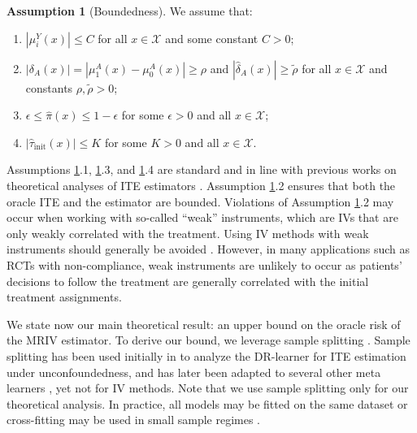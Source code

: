 \documentclass[nonatbib]{article}
\newcommand{\frameworkname}{MRIV\xspace}
\theoremstyle{definition}
\newtheorem{assumption}{Assumption}
\theoremstyle{plain}
\begin{document}
\begin{assumption}[Boundedness]\label{ass:boundedness}
We assume that:
\begin{enumerate}
    \item $|\mu_i^Y(x)| \leq C$ for all $x \in \mathcal{X}$ and some constant $C>0$;
    \item $|\delta_A (x)| = |\mu_1^A(x) - \mu_0^A(x)| \geq \rho$ and $|\hat{\delta}_A (x)| \geq \widetilde{\rho}$ for all $x \in \mathcal{X}$ and constants $\rho, \widetilde{\rho}>0$;
    \item $\epsilon \leq \hat{\pi}(x) \leq 1 - \epsilon$ for some $\epsilon > 0$ and all $x \in \mathcal{X}$;
    \item $|\hat{\tau}_{\mathrm{init}}(x)| \leq K$ for some $K > 0$ and all $x \in \mathcal{X}$.
\end{enumerate}    
\end{assumption}
Assumptions \ref{ass:boundedness}.1, \ref{ass:boundedness}.3, and \ref{ass:boundedness}.4 are standard and in line with previous works on theoretical analyses of ITE estimators \cite{Curth.2021,Kennedy.2020}. Assumption \ref{ass:boundedness}.2 ensures that both the oracle ITE and the estimator are bounded. Violations of Assumption \ref{ass:boundedness}.2 may occur when working with so-called ``weak'' instruments, which are IVs that are only weakly correlated with the treatment. Using IV methods with weak instruments should generally be avoided \cite{Li.2022}. However, in many applications such as RCTs with non-compliance, weak instruments are unlikely to occur as patients' decisions to follow the treatment are generally correlated with the initial treatment assignments.

We state now our main theoretical result: an upper bound on the oracle risk of the \frameworkname estimator. To derive our bound, we leverage sample splitting \cite{Kennedy.2020}. Sample splitting has been used initially in \cite{Kennedy.2020} to analyze the DR-learner for ITE estimation under unconfoundedness, and has later been adapted to several other meta learners \cite{Curth.2021}, yet not for IV methods. Note that we use sample splitting only for our theoretical analysis. In practice, all models may be fitted on the same dataset or cross-fitting may be used in small sample regimes \cite{Chernozhukov.2018}.
\end{document}
